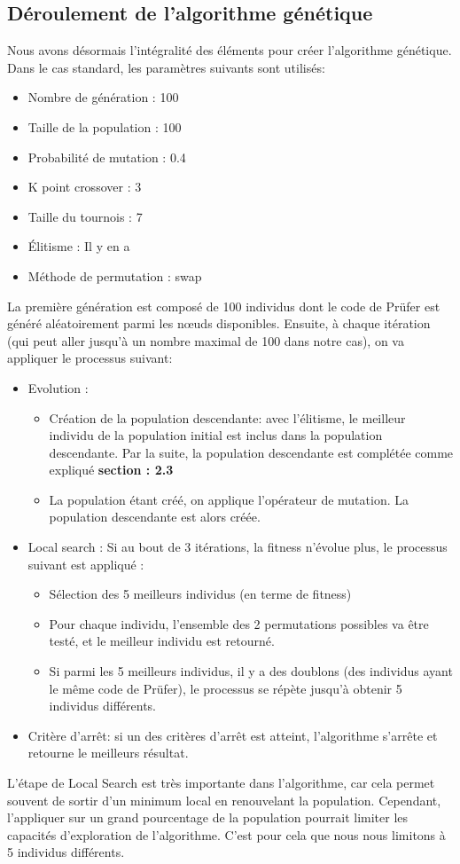 \documentclass{article} %
\begin{document}
\subsection{Déroulement de l'algorithme génétique}
Nous avons désormais l'intégralité des éléments pour créer l'algorithme génétique. Dans le cas standard, les paramètres suivants sont utilisés:
\begin{itemize}
	\item Nombre de génération : 100
	\item Taille de la population : 100
	\item Probabilité de mutation : 0.4
	\item K point crossover : 3
	\item Taille du tournois : 7
	\item Élitisme : Il y en a
	\item Méthode de permutation : swap
\end{itemize}
La première génération est composé de 100 individus dont le code de Prüfer est généré aléatoirement parmi les nœuds disponibles. Ensuite, à chaque itération (qui peut aller jusqu'à un nombre maximal de 100 dans notre cas), on va appliquer le processus suivant:
\begin{itemize}
	\item Evolution :\begin{itemize}
		\item Création de la population descendante: avec l'élitisme, le meilleur individu de la population initial est inclus dans la population descendante. Par la suite, la population descendante est complétée comme expliqué \textbf{section : 2.3}
		\item La population étant créé, on applique l'opérateur de mutation. La population descendante est alors créée.
	\end{itemize}
	\item Local search : Si au bout de 3 itérations, la fitness n'évolue plus, le processus suivant est appliqué :\begin{itemize}
		\item Sélection des 5 meilleurs individus (en terme de fitness)
		\item Pour chaque individu, l'ensemble des 2 permutations possibles va être testé, et le meilleur individu est retourné.
		\item Si parmi les 5 meilleurs individus, il y a des doublons (des individus ayant le même code de Prüfer), le processus se répète jusqu'à obtenir 5 individus différents.
	\end{itemize}
	\item Critère d'arrêt: si un des critères d'arrêt est atteint, l'algorithme s'arrête et retourne le meilleurs résultat.
\end{itemize}
L'étape de Local Search est très importante dans l'algorithme, car cela permet souvent de sortir d'un minimum local en renouvelant la population. Cependant, l'appliquer sur un grand pourcentage de la population pourrait limiter les capacités d'exploration de l'algorithme. C'est pour cela que nous nous limitons à 5 individus différents.
\newpage
\end{document}
